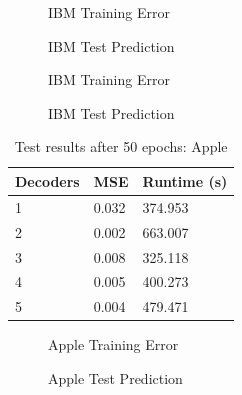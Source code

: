 \documentclass{article}
\begin{document}
    \begin{figure}[H]
      \centering
      \begin{minipage}[b]{0.4	\textwidth}
        \caption{IBM Training Error}
      \end{minipage}
      \hfill
      \begin{minipage}[b]{0.4	\textwidth}
        \caption{IBM Test Prediction}
      \end{minipage}
    \end{figure}
    \begin{figure}[H]
      \centering
      \begin{minipage}[b]{0.4	\textwidth}
        \caption{IBM Training Error}
      \end{minipage}
      \hfill
      \begin{minipage}[b]{0.4	\textwidth}
        \caption{IBM Test Prediction}
      \end{minipage}
    \end{figure}
    \begin{table}[H]
      \caption{Test results after 50 epochs: Apple}
      \centering
      \begin{tabular}{lll}
        \toprule
        Decoders     & MSE     & Runtime (s) \\
        \midrule
	 1 & 0.032 & 374.953 \\
	 2 & 0.002 & 663.007 \\
	 3 & 0.008 & 325.118 \\
	 4 & 0.005 & 400.273 \\
	 5 & 0.004 & 479.471 \\
      \bottomrule
      \end{tabular}
    \end{table}
    \begin{figure}[H]
      \centering
      \begin{minipage}[b]{0.4	\textwidth}
        \caption{Apple Training Error}
      \end{minipage}
      \hfill
      \begin{minipage}[b]{0.4	\textwidth}
        \caption{Apple Test Prediction}
      \end{minipage}
    \end{figure}
\end{document}
